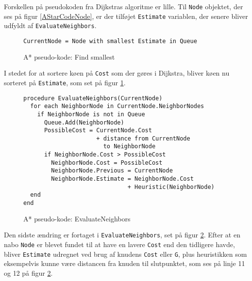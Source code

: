 Forskellen på pseudokoden fra Dijkstras algoritme er lille. Til \texttt{Node} objektet, der ses på figur \ref{AStarCodeNode}, er der tilføjet \texttt{Estimate} variablen, der senere bliver udfyldt af \texttt{EvaluateNeighbors}.

\begin{figure}[H]
\begin{lstlisting}
CurrentNode = Node with smallest Estimate in Queue
\end{lstlisting}
\caption{A* pseudo-kode: Find smallest}\label{AStarCodeFindSmallest}
\end{figure}

I stedet for at sortere køen på \texttt{Cost} som der gøres i Dijkstra, bliver køen nu sorteret på \texttt{Estimate}, som set på figur \ref{AStarCodeFindSmallest}.

\begin{figure}[H]
\begin{lstlisting}
procedure EvaluateNeighbors(CurrentNode)
  for each NeighborNode in CurrentNode.NeighborNodes
    if NeighborNode is not in Queue
      Queue.Add(NeighborNode)
      PossibleCost = CurrentNode.Cost 
                     + distance from CurrentNode
                       to NeighborNode
      if NeighborNode.Cost > PossibleCost
        NeighborNode.Cost = PossibleCost
        NeighborNode.Previous = CurrentNode
        NeighborNode.Estimate = NeighborNode.Cost
                              + Heuristic(NeighborNode)
  end
end
\end{lstlisting}
\caption{A* pseudo-kode: EvaluateNeighbors}\label{AStarCodeEvaluateNeighbors}
\end{figure}

Den sidste ændring er fortaget i \texttt{EvaluateNeighbors}, set på figur \ref{AStarCodeEvaluateNeighbors}. Efter at en nabo \texttt{Node} er blevet fundet til at have en lavere \texttt{Cost} end den tidligere havde, bliver \texttt{Estimate} udregnet ved brug af knudens \texttt{Cost} eller \texttt{G}, plus heuristikken som eksempelvis kunne være distancen fra knuden til slutpunktet, som ses på linje 11 og 12 på figur \ref{AStarCodeEvaluateNeighbors}.